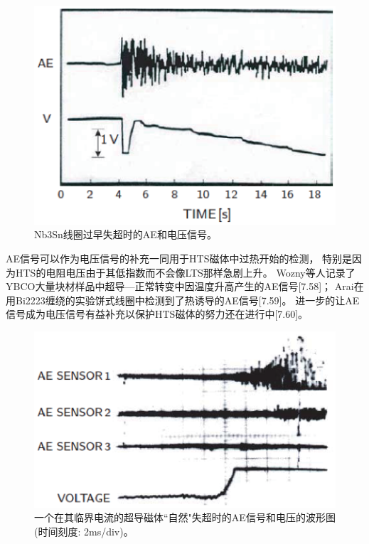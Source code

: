 \begin{figure}[htbp]
	\centering
	\includegraphics[scale=0.6]{chpt7/figs/fig7.8.eps}
	\caption{Nb3Sn线圈过早失超时的AE和电压信号。}
\end{figure}

AE信号可以作为电压信号的补充一同用于HTS磁体中过热开始的检测，
特别是因为HTS的电阻电压由于其低指数而不会像LTS那样急剧上升。
Wozny等人记录了YBCO大量块材样品中超导---正常转变中因温度升高产生的AE信号[7.58]；
Arai在用Bi2223缠绕的实验饼式线圈中检测到了热诱导的AE信号[7.59]。
进一步的让AE信号成为电压信号有益补充以保护HTS磁体的努力还在进行中[7.60]。

\begin{figure}[htbp]
	\centering
	\includegraphics[scale=0.6]{chpt7/figs/fig7.9.eps}
	\caption{一个在其临界电流的超导磁体``自然"失超时的AE信号和电压的波形图(时间刻度: 2ms/div)。}
\end{figure}

